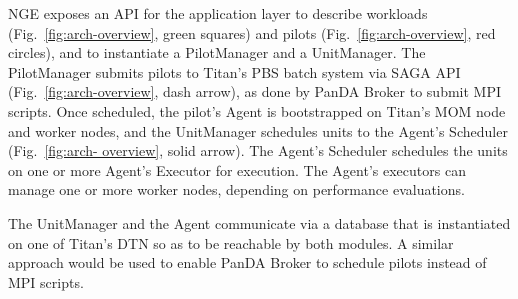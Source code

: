 NGE exposes an API for the application   layer
to describe workloads (Fig.~\ref{fig:arch-overview}, green squares) and pilots
(Fig.~\ref{fig:arch-overview}, red circles), and to instantiate a PilotManager
and a UnitManager.   The PilotManager submits pilots to Titan's PBS
 batch system via SAGA API
(Fig.~\ref{fig:arch-overview}, dash arrow), as done by PanDA Broker to submit
MPI scripts. Once scheduled, the pilot's Agent is bootstrapped on Titan's MOM
node and  worker nodes, and  the
UnitManager schedules units to the Agent's Scheduler (Fig.~\ref{fig:arch-
overview}, solid arrow). The Agent's Scheduler schedules the units on one or
more Agent's Executor for execution. The Agent's executors can manage one or
more worker nodes, depending on performance evaluations.

The UnitManager and the Agent communicate via a database that is instantiated on
one of Titan's DTN so as to be reachable by both modules. A similar approach would
be used to enable PanDA Broker to schedule pilots instead of MPI
scripts.


%

